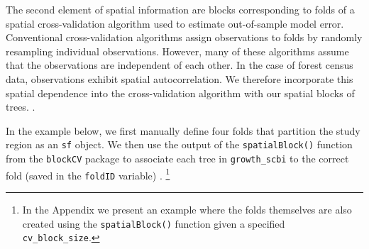 \documentclass[12pt]{article}
\begin{document}
The second element of spatial information are blocks corresponding to
folds of a spatial cross-validation algorithm used to estimate
out-of-sample model error. Conventional cross-validation algorithms
assign observations to folds by randomly resampling individual
observations. However, many of these algorithms assume that the
observations are independent of each other. In the case of forest census
data, observations exhibit spatial autocorrelation. We therefore
incorporate this spatial dependence into the cross-validation algorithm
with our spatial blocks of trees. \citet{roberts_cross-validation_2017}
\citet{pohjankukka_estimating_2017}.

In the example below, we first manually define four folds that partition
the study region as an \texttt{sf} object. We then use the output of the
\texttt{spatialBlock()} function from the \texttt{blockCV} package to
associate each tree in \texttt{growth\_scbi} to the correct fold (saved
in the \texttt{foldID} variable) \citet{valavi_blockcv_2019}.
\footnote{In the Appendix we present an example where the folds
  themselves are also created using the \texttt{spatialBlock()} function
  given a specified \texttt{cv\_block\_size}.}
\end{document}
